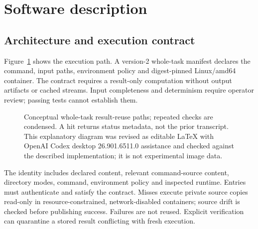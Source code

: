 \documentclass[preprint,12pt,a4paper]{elsarticle}
\begin{document}
\section{Software description}
\subsection{Architecture and execution contract}
Figure~\ref{fig:architecture} shows the execution path. A version-2 whole-task manifest declares the command, input paths, environment policy and digest-pinned Linux/amd64 container. The contract requires a result-only computation without output artifacts or cached streams. Input completeness and determinism require operator review; passing tests cannot establish them.

\begin{figure}[htbp]
\centering
\setlength{\fboxsep}{7pt}
\caption{Conceptual whole-task result-reuse paths; repeated checks are condensed. A hit returns status metadata, not the prior transcript. This explanatory diagram was revised as editable LaTeX with OpenAI Codex desktop 26.901.6511.0 assistance and checked against the described implementation; it is not experimental image data.}
\label{fig:architecture}
\end{figure}

The identity includes declared content, relevant command-source content, directory modes, command, environment policy and inspected runtime. Entries must authenticate and satisfy the contract. Misses execute private source copies read-only in resource-constrained, network-disabled containers; source drift is checked before publishing success. Failures are not reused. Explicit verification can quarantine a stored result conflicting with fresh execution.
\end{document}
